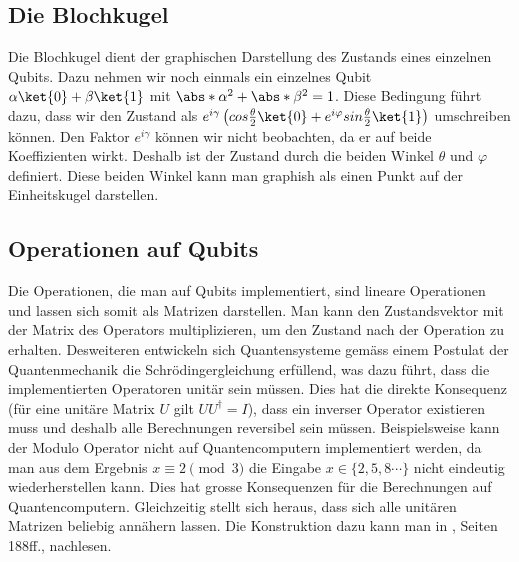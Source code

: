 \subsection{Die Blochkugel}
Die Blochkugel dient der graphischen Darstellung des Zustands eines einzelnen Qubits. Dazu nehmen wir noch einmals ein einzelnes Qubit $\alpha\ket{0} + \beta\ket{1}$ mit $\abs*{\alpha}^2 + \abs*{\beta}^2 = 1$. Diese Bedingung führt dazu, dass wir den Zustand als $e^{i\gamma}\left(cos\frac{\theta}{2}\ket{0} + e^{i\varphi}sin\frac{\theta}{2}\ket{1}\right)$ umschreiben können. Den Faktor $e^{i\gamma}$ können wir nicht beobachten, da er auf beide Koeffizienten wirkt. Deshalb ist der Zustand durch die beiden Winkel $\theta$ und $\varphi$ definiert. Diese beiden Winkel kann man graphish als einen Punkt auf der Einheitskugel darstellen.


\subsection{Operationen auf Qubits}
Die Operationen, die man auf Qubits implementiert, sind lineare Operationen und lassen sich somit als Matrizen darstellen. Man kann den Zustandsvektor mit der Matrix des Operators multiplizieren, um den Zustand nach der Operation zu erhalten. Desweiteren entwickeln sich Quantensysteme gemäss einem Postulat der Quantenmechanik die Schrödingergleichung erfüllend, was dazu führt, dass die implementierten Operatoren unitär sein müssen. Dies hat die direkte Konsequenz (für eine unitäre Matrix $U$ gilt $UU^{\dagger} = I$), dass ein inverser Operator existieren muss und deshalb alle Berechnungen reversibel sein müssen. Beispielsweise kann der Modulo Operator nicht auf Quantencomputern implementiert werden, da man aus dem Ergebnis $x \equiv 2 \pmod{3}$ die Eingabe $x \in \{2, 5, 8\cdots\}$ nicht eindeutig wiederherstellen kann. Dies hat grosse Konsequenzen für die Berechnungen auf Quantencomputern. Gleichzeitig stellt sich heraus, dass sich alle unitären Matrizen beliebig annähern lassen. Die Konstruktion dazu kann man in \cite{QC}, Seiten 188ff., nachlesen.

